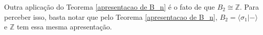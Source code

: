	
	
	
	
	
	
	
	
	\par\vspace{0.3cm} Outra aplicação do Teorema \eqref{apresentacao de B_n} é o fato de que $B_2\cong\mathbb{Z}$. Para perceber isso, basta notar que pelo Teorema \eqref{apresentacao de B_n}, $B_2 = \langle \sigma_1 | - \rangle$ e $\mathbb{Z}$ tem essa mesma apresentação. 
	

